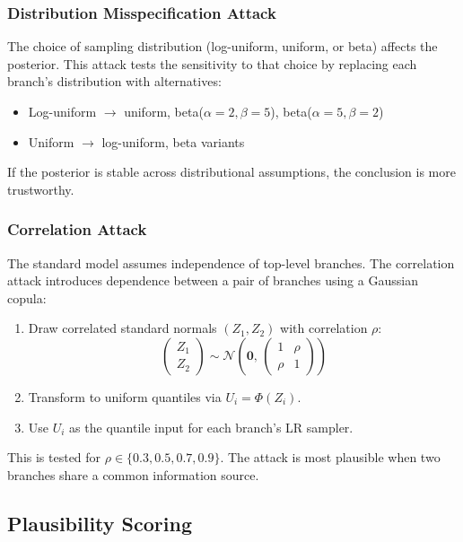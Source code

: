 \documentclass[11pt,a4paper]{article}
\begin{document}
\subsubsection{Distribution Misspecification Attack}

The choice of sampling distribution (log-uniform, uniform, or beta) affects the
posterior.  This attack tests the sensitivity to that choice by replacing each
branch's distribution with alternatives:
\begin{itemize}
\item Log-uniform $\to$ uniform, beta($\alpha{=}2, \beta{=}5$), beta($\alpha{=}5, \beta{=}2$)
\item Uniform $\to$ log-uniform, beta variants
\end{itemize}
If the posterior is stable across distributional assumptions, the conclusion is
more trustworthy.

\subsubsection{Correlation Attack}

The standard model assumes independence of top-level branches.  The correlation
attack introduces dependence between a pair of branches using a Gaussian copula:
\begin{enumerate}
\item Draw correlated standard normals $(Z_1, Z_2)$ with correlation $\rho$:
  \[
    \begin{pmatrix} Z_1 \\ Z_2 \end{pmatrix}
    \sim \mathcal{N}\!\left(
      \mathbf{0},\,
      \begin{pmatrix} 1 & \rho \\ \rho & 1 \end{pmatrix}
    \right)
  \]
\item Transform to uniform quantiles via $U_i = \Phi(Z_i)$.
\item Use $U_i$ as the quantile input for each branch's LR sampler.
\end{enumerate}
This is tested for $\rho \in \{0.3, 0.5, 0.7, 0.9\}$.  The attack is most
plausible when two branches share a common information source.

\subsection{Plausibility Scoring}
\end{document}
